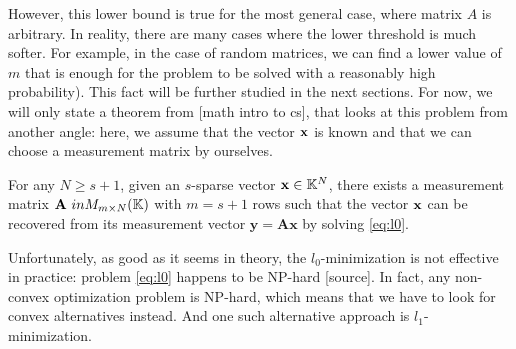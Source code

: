 However, this lower bound is true for the most general case, where matrix $A$ is arbitrary.
In reality, there are many cases where the lower threshold is much softer.
For example, in the case of random matrices, we can find a lower value of $m$ that is enough for the problem to be solved with a reasonably high probability).
This fact will be further studied in the next sections.
For now, we will only state a theorem from [math intro to cs], that looks at this problem from another angle: here, we assume that the vector
$\mathbf{x}$ is known and that we can choose a measurement matrix by ourselves.

\begin{theorem}
    For any $N \geq s+1$, given an $s$-sparse vector $\mathbf{x} \in \mathbb{K}^N$, there exists a measurement matrix $\mathbf{A} \ in M_{m\times N}(\mathbb{K})$
    with $m=s+1$ rows such that the vector $\mathbf{x}$ can be recovered from its measurement vector $\mathbf{y=Ax}$ by solving \ref{eq:l0}.
\end{theorem}

Unfortunately, as good as it seems in theory, the $l_0$-minimization is not effective in practice: problem \ref{eq:l0} happens to be NP-hard [source].
In fact, any non-convex optimization problem is NP-hard, which means that we have to look for convex alternatives instead.
And one such alternative approach is $l_1$-minimization.